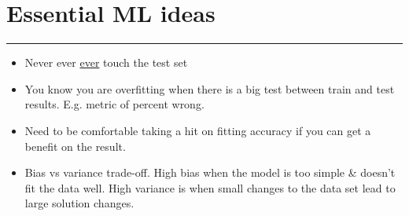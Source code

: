 \section{Essential ML ideas}
\smallskip \hrule height 2pt \smallskip

\begin{itemize}
	\item Never ever \underline{ever} touch the test set
	\item You know you are overfitting when there is a big test between train and test results.  E.g. metric of percent wrong. 
	\item Need to be comfortable taking a hit on fitting accuracy if you can get a benefit on the result.
	\item Bias vs variance trade-off.  
		High bias when the model is too simple \& doesn't fit the data well.  
		High variance is when small changes to the data set lead to large solution changes. 
\end{itemize}